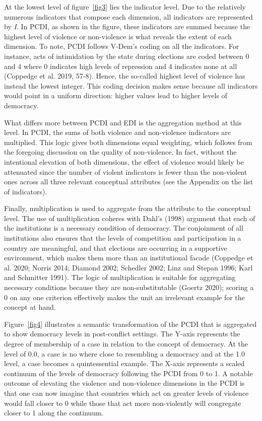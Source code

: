 \documentclass [11pt]{article}
\begin{document}
At the lowest level of figure~\ref{fig3} lies the indicator level. Due to the relatively numerous indicators that compose each dimension, all indicators are represented by \emph{I}. In PCDI, as shown in the figure, these indicators are summed because the highest level of violence or non-violence is what reveals the extent of each dimension. To note, PCDI follows V-Dem's coding on all the indicators. For instance, acts of intimidation by the state during elections are coded between 0 and 4 where 0 indicates high levels of repression and 4 indicates none at all (Coppedge et al. 2019, 57-8). Hence, the so-called highest level of violence has instead the lowest integer. This coding decision makes sense because all indicators would point in a uniform direction: higher values lead to higher levels of democracy.

What differs more between PCDI and EDI is the aggregation method at this level. In PCDI, the sums of both violence and non-violence indicators are multiplied. This logic gives both dimensions equal weighting, which follows from the foregoing discussion on the quality of non-violence. In fact, without the intentional elevation of both dimensions, the effect of violence would likely be attenuated since the number of violent indicators is fewer than the non-violent ones across all three relevant conceptual attributes (see the Appendix on the list of indicators).

Finally, multiplication is used to aggregate from the attribute to the conceptual level. The use of multiplication coheres with Dahl's (1998) argument that each of the institutions is a necessary condition of democracy. The conjoinment of all institutions also ensures that the levels of competition and participation in a country are meaningful, and that elections are occurring in a supportive environment, which makes them more than an institutional facade (Coppedge et al. 2020; Norris 2014; Diamond 2002; Schedler 2002; Linz and Stepan 1996; Karl and Schmitter 1991). The logic of multiplication is suitable for aggregating necessary conditions because they are non-substitutable (Goertz 2020); scoring a 0 on any one criterion effectively makes the unit an irrelevant example for the concept at hand.

Figure~\ref{fig4} illustrates a semantic transformation of the PCDI that is aggregated to show democracy levels in post-conflict settings. The Y-axis represents the degree of membership of a case in relation to the concept of democracy. At the level of 0.0, a case is no where close to resembling a democracy and at the 1.0 level, a case becomes a quintessential example. The X-axis represents a scaled continuum of the levels of democracy following the PCDI from 0 to 1. A notable outcome of elevating the violence and non-violence dimensions in the PCDI is that one can now imagine that countries which act on greater levels of violence would fall closer to 0 while those that act more non-violently will congregate closer to 1 along the continuum.
\end{document}
